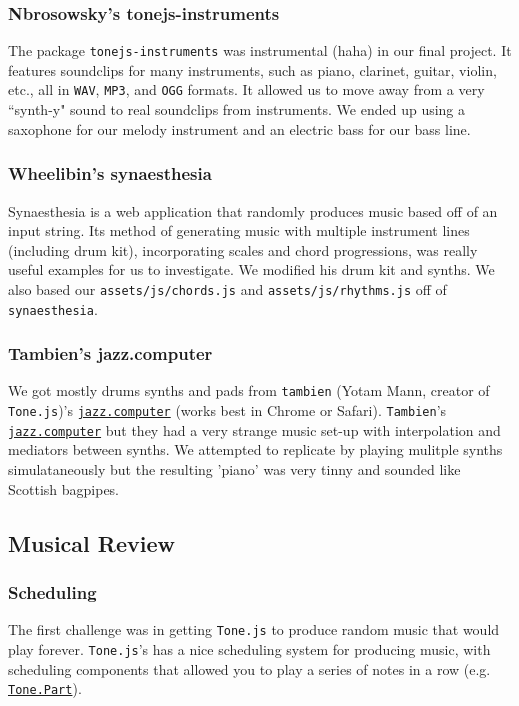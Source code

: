 \documentclass[12pt,a4paper]{article}
\newcommand{\code}{\texttt}
\newcommand{\lightcode}[1]{\colorbox{light-gray}{\texttt{#1}}}
\begin{document}
\subsubsection{Nbrosowsky's tonejs-instruments}
The package \lightcode{tonejs-instruments} was instrumental (haha) in our final project. It features soundclips for many instruments, such as piano, clarinet, guitar, violin, etc., all in \code{WAV}, \code{MP3}, and \code{OGG} formats. It allowed us to move away from a very ``synth-y" sound to real soundclips from instruments. We ended up using a saxophone for our melody instrument and an electric bass for our bass line.

\subsubsection{Wheelibin's synaesthesia}
Synaesthesia is a web application that randomly produces music based off of an input string. Its method of generating music with multiple instrument lines (including drum kit), incorporating scales and chord progressions, was really useful examples for us to investigate. We modified his drum kit and synths. We also based our \code{assets/js/chords.js} and \code{assets/js/rhythms.js} off of \lightcode{synaesthesia}.

\subsubsection{Tambien's jazz.computer}
We got mostly drums synths and pads from \code{tambien} (Yotam Mann, creator of \lightcode{Tone.js})'s \href{http://jazz.computer/}{\lightcode{jazz.computer}} (works best in Chrome or Safari). \code{Tambien}'s \href{http://jazz.computer/}{\lightcode{jazz.computer}} but they had a very strange music set-up with interpolation and mediators between synths. We attempted to replicate by playing mulitple synths simulataneously but the resulting 'piano' was very tinny and sounded like Scottish bagpipes.


\subsection{Musical Review}

\subsubsection{Scheduling}
The first challenge was in getting \lightcode{Tone.js} to produce random music that would play forever. \lightcode{Tone.js}'s has a nice scheduling system for producing music, with scheduling components that allowed you to play a series of notes in a row (e.g. \href{https://tonejs.github.io/docs/r12/Part}{\lightcode{Tone.Part}}).
\end{document}
